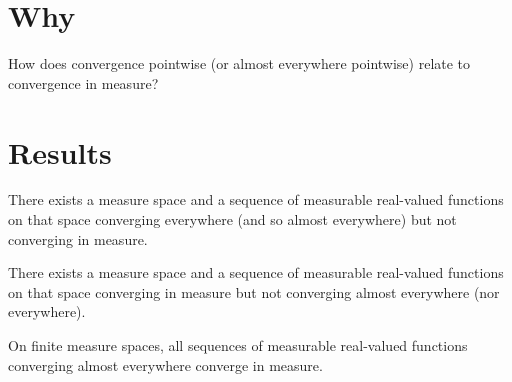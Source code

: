 

\section*{Why}

How does convergence pointwise (or almost everywhere pointwise) relate to convergence in measure?

\section*{Results}

\begin{proposition}
There exists
a measure space
and a sequence of
measurable
real-valued functions
on that space
converging everywhere
(and so almost everywhere)
but not converging
in measure.
\end{proposition}

\begin{proposition}
There exists
a measure space
and a sequence of
measurable
real-valued functions
on that space
converging in measure
but not converging almost
everywhere (nor everywhere).
\end{proposition}

\begin{proposition}
On finite measure spaces, all sequences of measurable real-valued functions converging almost everywhere converge in measure.
\end{proposition}

